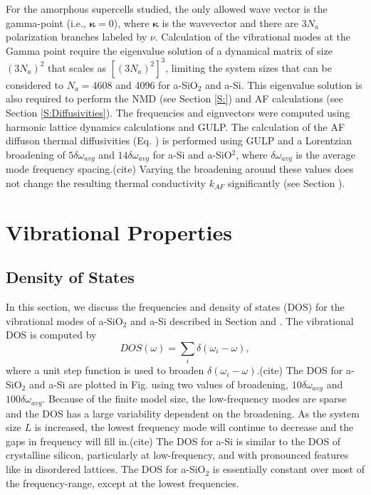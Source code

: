 \documentclass[aps,prb,twocolumn,superscriptaddress,footinbib,amsmath,amssymb,floatfix]{revtex4}
\begin{document}
For the amorphous supercells studied,
the only allowed wave vector is the gamma-point (i.e., $\pmb{\kappa}=0$),  
where $\pmb{\kappa}$ is the wavevector and there are $3N_a$ polarization 
branches labeled by $\nu$. 
Calculation of the 
vibrational modes at the Gamma point require the eigenvalue solution 
of a dynamical matrix of size 
$(3N_a)^2$ that scales as $[(3N_a)^2]^3$, limiting the system 
sizes that can be considered to $N_a = 4608$ and 4096 for a-SiO$_2$ and a-Si. 
This eigenvalue solution is also required to perform the NMD (see Section \ref{S:})  
and AF calculations (see Section \ref{S:Diffusivities}). 
The frequencies and eignvectors were computed using harmonic
lattice dynamics calculations and GULP.\cite{gale_general_2003} 
The calculation of the AF diffuson thermal diffusivities (Eq. ) 
is performed using GULP and a Lorentzian 
broadening of $5\delta\omega_{avg}$ and $14\delta\omega_{avg}$ for 
a-Si and a-SiO$^2$, where $\delta\omega_{avg}$ is the average mode 
frequency spacing.(cite) Varying the broadening around these values does not 
change the resulting thermal conductivity $k_{AF}$ significantly 
(see Section ). 

\section{\label{S:Vibrational}Vibrational Properties}

\subsection{\label{S:DOS}Density of States}

In this section, we discuss the frequencies and density of states (DOS)  
for the vibrational modes of a-SiO$_2$ and a-Si described 
in Section and . 
The vibrational DOS is computed by 
\begin{equation}\label{EQ:DOS}
DOS(\omega) = \sum_i \delta(\omega_i - \omega),
\end{equation}
where a unit step function is used to broaden 
$\delta(\omega_i - \omega)$.(cite)  
The DOS for a-SiO$_2$ and a-Si are plotted in Fig. using two values of 
broadening, $10\delta\omega_{avg}$ and $100\delta\omega_{avg}$.  
Because of the finite model size, the low-frequency modes are sparse and 
the DOS has a large variability dependent on the broadening.
\cite{feldman_numerical_1999} 
As the system size $L$ is increased, the lowest frequency mode will 
continue to decrease and the gaps in frequency will fill in.(cite)  
The DOS for a-Si is similar to the 
DOS of crystalline silicon,
\cite{williams_numerical_1989,donadio_atomistic_2009} particularly 
at low-frequency, and with pronounced features like in disordered lattices.
\cite{larkin_predicting_2013,beltukov_ioffe-regel_2013} The DOS for 
a-SiO$_2$ is essentially constant over most of the frequency-range, 
except at the lowest frequencies. 
\end{document}
